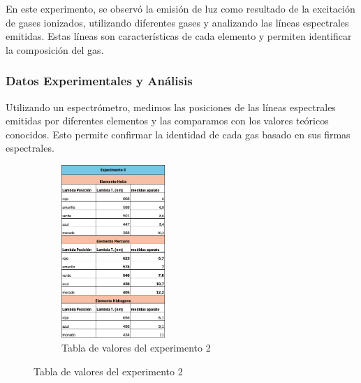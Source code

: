 En este experimento, se observó la emisión de luz como resultado de la excitación de gases ionizados, utilizando diferentes gases y analizando las líneas espectrales emitidas. Estas líneas son características de cada elemento y permiten identificar la composición del gas.

\subsubsection{Datos Experimentales y Análisis}
Utilizando un espectrómetro, medimos las posiciones de las líneas espectrales emitidas por diferentes elementos y las comparamos con los valores teóricos conocidos. Esto permite confirmar la identidad de cada gas basado en sus firmas espectrales.

\begin{figure}[H]
  \centering
  \begin{subfigure}[b]{\textwidth}
      \centering
      \includegraphics[width=0.43\textwidth]{Figures/1. Content/tabla-experimento-2.png}
      \caption{Tabla de valores del experimento 2}
      \label{fig: Tabla experimento 2}
  \end{subfigure}
  \hfill
\end{figure}

